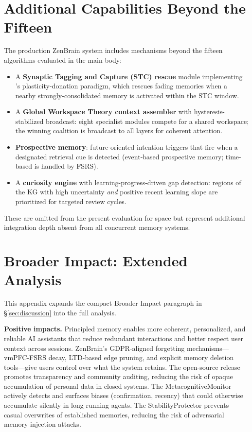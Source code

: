 \documentclass{article}
\begin{document}
\section{Additional Capabilities Beyond the Fifteen}
\label{app:additional-capabilities}

The production ZenBrain system includes mechanisms beyond the fifteen
algorithms evaluated in the main body:
\begin{itemize}
    \item A \textbf{Synaptic Tagging and Capture (STC) rescue} module
    implementing \citet{frey1997}'s plasticity-donation paradigm, which
    rescues fading memories when a nearby strongly-consolidated memory
    is activated within the STC window.
    \item A \textbf{Global Workspace Theory context assembler}
    \citep{baars1988} with hysteresis-stabilized broadcast: eight
    specialist modules compete for a shared workspace; the winning
    coalition is broadcast to all layers for coherent attention.
    \item \textbf{Prospective memory}: future-oriented intention triggers
    that fire when a designated retrieval cue is detected
    (event-based prospective memory; time-based is handled by FSRS).
    \item A \textbf{curiosity engine} with learning-progress-driven gap
    detection: regions of the KG with high uncertainty \emph{and}
    positive recent learning slope are prioritized for targeted review
    cycles.
\end{itemize}
These are omitted from the present evaluation for space but represent
additional integration depth absent from all concurrent memory systems.

\section{Broader Impact: Extended Analysis}
\label{app:broader-impact}

This appendix expands the compact Broader Impact paragraph in
\S\ref{sec:discussion} into the full analysis.

\textbf{Positive impacts.}
Principled memory enables more coherent, personalized, and reliable AI
assistants that reduce redundant interactions and better respect user
context across sessions.
ZenBrain's GDPR-aligned forgetting mechanisms---vmPFC-FSRS decay,
LTD-based edge pruning, and explicit memory deletion tools---give users
control over what the system retains.
The open-source release promotes transparency and community auditing,
reducing the risk of opaque accumulation of personal data in closed
systems.
The MetacognitiveMonitor actively detects and surfaces biases
(confirmation, recency) that could otherwise accumulate silently in
long-running agents.
The StabilityProtector prevents casual overwrites of established
memories, reducing the risk of adversarial memory injection attacks.
\end{document}

